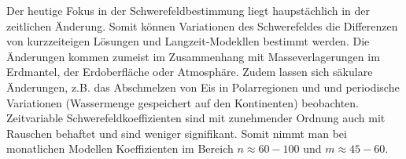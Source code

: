 \documentclass[9pt, landscape, fleqn]{scrartcl}
\begin{document}
\begin{multicols*}{3}
Der heutige Fokus in der Schwerefeldbestimmung liegt haupstächlich in der zeitlichen Änderung. Somit können Variationen des Schwerefeldes die Differenzen von kurzzeiteigen Lösungen und Langzeit-Modekllen bestimmt werden. Die Änderungen kommen zumeist im Zusammenhang mit Masseverlagerungen im Erdmantel, der Erdoberfläche oder Atmosphäre. Zudem lassen sich säkulare Änderungen, z.B. das Abschmelzen von Eis in Polarregionen und und periodische Variationen (Wassermenge gespeichert auf den Kontinenten) beobachten. \\

Zeitvariable Schwerefeldkoeffizienten sind mit zunehmender Ordnung auch mit Rauschen behaftet und sind weniger signifikant. Somit nimmt man bei monatlichen Modellen Koeffizienten im Bereich $n \approx 60-100$ und $m \approx 45-60$. 
\end{multicols*}
\end{document}
